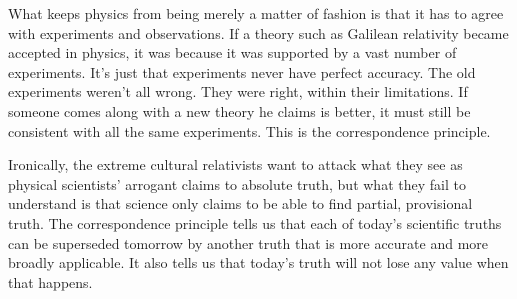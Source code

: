 What keeps physics from being merely a matter of fashion is that it has to agree
with experiments and observations. If a theory such as Galilean relativity
became accepted in physics, it was because it was supported
by a vast number of experiments. It's just that experiments never have perfect
accuracy. The old experiments weren't all
wrong. They were right, within their limitations. If someone comes along with a
new theory he claims is better, it must still be consistent with all the same
experiments. This is the correspondence principle.

Ironically, the extreme cultural relativists want to attack what they see
as physical scientists' arrogant claims to absolute truth, but what they
fail to understand is that science only claims to be able to find partial, provisional truth.
The correspondence principle tells us that each of today's scientific truths can be superseded
tomorrow by another truth that is more accurate and more broadly applicable. It also
tells us that today's truth will not lose any value when that happens.
